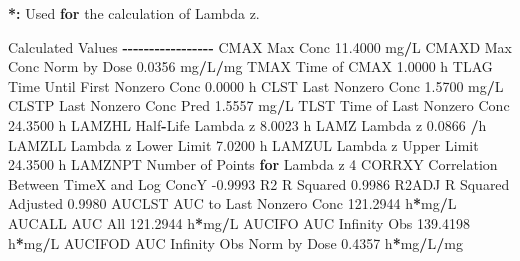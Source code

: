 \documentclass[
  10pt,
]{krantz}
\makeatletter
\newenvironment{Shaded}{\begin{snugshade}}{\end{snugshade}}
\newcommand{\ControlFlowTok}[1]{\textcolor[rgb]{0.13,0.29,0.53}{\textbf{#1}}}
\newcommand{\DecValTok}[1]{\textcolor[rgb]{0.00,0.00,0.81}{#1}}
\newcommand{\ErrorTok}[1]{\textcolor[rgb]{0.64,0.00,0.00}{\textbf{#1}}}
\newcommand{\FloatTok}[1]{\textcolor[rgb]{0.00,0.00,0.81}{#1}}
\newcommand{\NormalTok}[1]{#1}
\newcommand{\OperatorTok}[1]{\textcolor[rgb]{0.81,0.36,0.00}{\textbf{#1}}}
\newcommand{\StringTok}[1]{\textcolor[rgb]{0.31,0.60,0.02}{#1}}
\newenvironment{kframe}{%
\medskip{}
\setlength{\fboxsep}{.8em}
 \def\at@end@of@kframe{}%
 \ifinner\ifhmode%
  \def\at@end@of@kframe{\end{minipage}}%
  \begin{minipage}{\columnwidth}%
 \fi\fi%
 \def\FrameCommand##1{\hskip\@totalleftmargin \hskip-\fboxsep
 \colorbox{shadecolor}{##1}\hskip-\fboxsep
     \hskip-\linewidth \hskip-\@totalleftmargin \hskip\columnwidth}%
 \MakeFramed {\advance\hsize-\width
   \@totalleftmargin\z@ \linewidth\hsize
   \@setminipage}}%
 {\par\unskip\endMakeFramed%
 \at@end@of@kframe}
\renewenvironment{Shaded}{\begin{kframe}}{\end{kframe}}
\makeatother
\begin{document}
\begin{Shaded}
\begin{Highlighting}[]
\OperatorTok{*}\ErrorTok{:}\StringTok{ }\NormalTok{Used }\ControlFlowTok{for}\NormalTok{ the calculation of Lambda z.}


\NormalTok{Calculated Values}
\OperatorTok{{-}{-}{-}{-}{-}{-}{-}{-}{-}{-}{-}{-}{-}{-}{-}{-}{-}}
\NormalTok{CMAX       Max Conc                                       }\FloatTok{11.4000}\NormalTok{ mg}\OperatorTok{/}\NormalTok{L}
\NormalTok{CMAXD      Max Conc Norm by Dose                           }\FloatTok{0.0356}\NormalTok{ mg}\OperatorTok{/}\NormalTok{L}\OperatorTok{/}\NormalTok{mg}
\NormalTok{TMAX       Time of CMAX                                    }\FloatTok{1.0000}\NormalTok{ h}
\NormalTok{TLAG       Time Until First Nonzero Conc                   }\FloatTok{0.0000}\NormalTok{ h}
\NormalTok{CLST       Last Nonzero Conc                               }\FloatTok{1.5700}\NormalTok{ mg}\OperatorTok{/}\NormalTok{L}
\NormalTok{CLSTP      Last Nonzero Conc Pred                          }\FloatTok{1.5557}\NormalTok{ mg}\OperatorTok{/}\NormalTok{L}
\NormalTok{TLST       Time of Last Nonzero Conc                      }\FloatTok{24.3500}\NormalTok{ h}
\NormalTok{LAMZHL     Half}\OperatorTok{{-}}\NormalTok{Life Lambda z                              }\FloatTok{8.0023}\NormalTok{ h}
\NormalTok{LAMZ       Lambda z                                        }\FloatTok{0.0866} \OperatorTok{/}\NormalTok{h}
\NormalTok{LAMZLL     Lambda z Lower Limit                            }\FloatTok{7.0200}\NormalTok{ h}
\NormalTok{LAMZUL     Lambda z Upper Limit                           }\FloatTok{24.3500}\NormalTok{ h}
\NormalTok{LAMZNPT    Number of Points }\ControlFlowTok{for}\NormalTok{ Lambda z                   }\DecValTok{4}
\NormalTok{CORRXY     Correlation Between TimeX and Log ConcY        }\FloatTok{{-}0.9993} 
\NormalTok{R2         R Squared                                       }\FloatTok{0.9986} 
\NormalTok{R2ADJ      R Squared Adjusted                              }\FloatTok{0.9980} 
\NormalTok{AUCLST     AUC to Last Nonzero Conc                      }\FloatTok{121.2944}\NormalTok{ h}\OperatorTok{*}\NormalTok{mg}\OperatorTok{/}\NormalTok{L}
\NormalTok{AUCALL     AUC All                                       }\FloatTok{121.2944}\NormalTok{ h}\OperatorTok{*}\NormalTok{mg}\OperatorTok{/}\NormalTok{L}
\NormalTok{AUCIFO     AUC Infinity Obs                              }\FloatTok{139.4198}\NormalTok{ h}\OperatorTok{*}\NormalTok{mg}\OperatorTok{/}\NormalTok{L}
\NormalTok{AUCIFOD    AUC Infinity Obs Norm by Dose                   }\FloatTok{0.4357}\NormalTok{ h}\OperatorTok{*}\NormalTok{mg}\OperatorTok{/}\NormalTok{L}\OperatorTok{/}\NormalTok{mg}

\end{Highlighting}
\end{Shaded}
\end{document}
